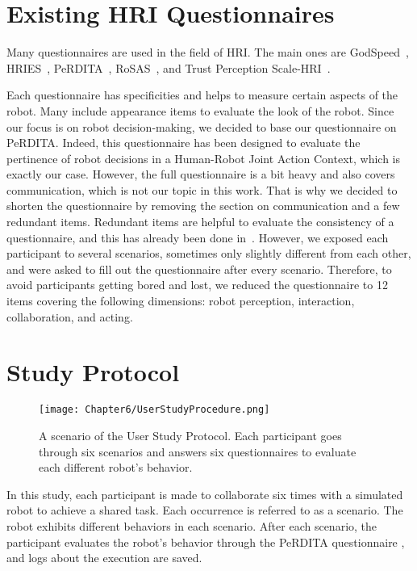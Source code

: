 \section{Existing HRI Questionnaires}

Many questionnaires are used in the field of HRI. The main ones are GodSpeed~\cite{bartneck_measurement_2009}, HRIES~\cite{spatola_perception_2021}, PeRDITA~\cite{devin_evaluating_2018}, RoSAS~\cite{carpinella_robotic_2017}, and Trust Perception Scale-HRI~\cite{mittu_measuring_2016}. 

Each questionnaire has specificities and helps to measure certain aspects of the robot. Many include appearance items to evaluate the look of the robot. Since our focus is on robot decision-making, we decided to base our questionnaire on PeRDITA. Indeed, this questionnaire has been designed to evaluate the pertinence of robot decisions in a Human-Robot Joint Action Context, which is exactly our case. However, the full questionnaire is a bit heavy and also covers communication, which is not our topic in this work. 
That is why we decided to shorten the questionnaire by removing the section on communication and a few redundant items. Redundant items are helpful to evaluate the consistency of a questionnaire, and this has already been done in~\cite{devin_evaluating_2018}. 
However, we exposed each participant to several scenarios, sometimes only slightly different from each other, and were asked to fill out the questionnaire after every scenario. Therefore, to avoid participants getting bored and lost, we reduced the questionnaire to 12 items covering the following dimensions: robot perception, interaction, collaboration, and acting.


\section{Study Protocol} \label{sec:study_protocol}

\begin{figure}
    \centering
    \texttt{[image: Chapter6/UserStudyProcedure.png]}
    \caption{A scenario of the User Study Protocol. Each participant goes through six scenarios and answers six questionnaires to evaluate each different robot's behavior.}
    \label{fig:user_study_protocol}
\end{figure}


In this study, each participant is made to collaborate six times with a simulated robot to achieve a shared task. Each occurrence is referred to as a scenario. The robot exhibits different behaviors in each scenario. After each scenario, the participant evaluates the robot's behavior through the PeRDITA questionnaire \cite{devin_evaluating_2018}, and logs about the execution are saved.

